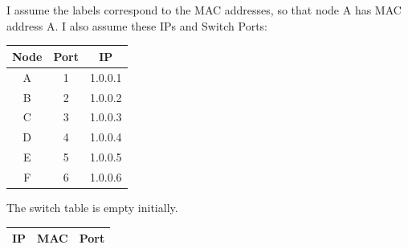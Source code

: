 \documentclass[12pt, a4paper]{article}
\begin{document}
\section{} %
I assume the labels correspond to the MAC addresses, so that node A has MAC address A. I also assume these IPs and Switch Ports:

\begin{tabular}{|c|c|c|}
	\hline
	\textbf{Node} & \textbf{Port} & \textbf{IP}\\\hline
	A & 1 & 1.0.0.1 \\\hline
	B & 2 & 1.0.0.2 \\\hline
	C & 3 & 1.0.0.3 \\\hline
	D & 4 & 1.0.0.4 \\\hline
	E & 5 & 1.0.0.5 \\\hline
	F & 6 & 1.0.0.6 \\\hline
\end{tabular}

The switch table is empty initially.

\begin{tabular}{|c|c|c|}
	\hline
	\textbf{IP} & \textbf{MAC} & \textbf{Port}\\\hline
\end{tabular}
\end{document}
